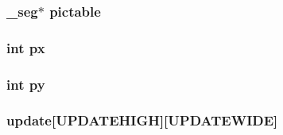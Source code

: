\label{ID__VH_8C_a4837949d7c7b2ed1e3f5874b69986fd8}
\hypertarget{ID__VH_8C_a1ba97b4fa7a2259ee911a1154eda1dc9}{
\subsubsection[{pictable}]{ \_\-seg$\ast$ {\bf pictable}}}
\label{ID__VH_8C_a1ba97b4fa7a2259ee911a1154eda1dc9}
\hypertarget{ID__VH_8C_a6bbc6b7e52b17450c52d8e748d6abae1}{
\subsubsection[{px}]{\setlength{\rightskip}{0pt plus 5cm}int {\bf px}}}
\label{ID__VH_8C_a6bbc6b7e52b17450c52d8e748d6abae1}
\hypertarget{ID__VH_8C_aa9511a47fd6271333948489a220e3029}{
\subsubsection[{py}]{\setlength{\rightskip}{0pt plus 5cm}int {\bf py}}}
\label{ID__VH_8C_aa9511a47fd6271333948489a220e3029}
\hypertarget{ID__VH_8C_afbdf4a0314978cdee83ec9193c21bba9}{
\subsubsection[{update}]{ {\bf update}\mbox{[}UPDATEHIGH\mbox{]}\mbox{[}UPDATEWIDE\mbox{]}}}
\label{ID__VH_8C_afbdf4a0314978cdee83ec9193c21bba9}
